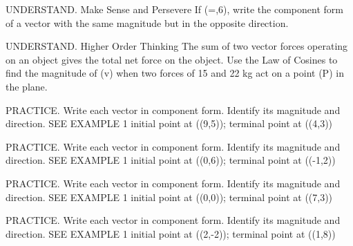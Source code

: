 \documentclass{article}
\newenvironment{practice}[2]{}{}        %
\newcommand{\answer}[1]{}               %
\newcommand{\placeholder}[2]{}          %
\newcommand{\te}[1]{}                   %
\begin{document}
\begin{practice}{15}{1}
UNDERSTAND. Make Sense and Persevere If (=,6\rangle), write the component form of a vector with the same magnitude but in the opposite direction.
\answer{(\langle2,-6\rangle)}
\end{practice}
\begin{practice}{16}{3}
UNDERSTAND. Higher Order Thinking The sum of two vector forces operating on an object gives the total net force on the object. Use the Law of Cosines to find the magnitude of (\vec v) when two forces of 15 and 22 kg act on a point (P) in the plane.
\placeholder{diagram}{Parallelogram of forces with lower-left vertex P. Blue arrows from P run up-left with magnitude 22 and right/slightly upward with magnitude 15. Dashed opposite sides are labeled 15 on top and 22 on right. Red resultant v runs from P to the opposite upper vertex. Interior angle at P is 100 degrees; interior lower-right angle is 80 degrees.}
\answer{The magnitude of (\vec v) is approximately 24 kg.}
\te{Printed force unit kg retained.}
\end{practice}
\begin{practice}{17}{1}
PRACTICE. Write each vector in component form. Identify its magnitude and direction. SEE EXAMPLE 1
initial point at ((9,5)); terminal point at ((4,3))
\answer{(\langle-5,-2\rangle); magnitude (=\sqrt{29}\approx5.4); direction (\approx201.8^\circ)}
\end{practice}
\begin{practice}{18}{1}
PRACTICE. Write each vector in component form. Identify its magnitude and direction. SEE EXAMPLE 1
initial point at ((0,6)); terminal point at ((-1,2))
\answer{(\langle-1,-4\rangle); magnitude (=\sqrt{17}\approx4.1); direction (\approx256^\circ)}
\end{practice}
\begin{practice}{19}{1}
PRACTICE. Write each vector in component form. Identify its magnitude and direction. SEE EXAMPLE 1
initial point at ((0,0)); terminal point at ((7,3))
\answer{(\langle7,3\rangle); magnitude (=\sqrt{58}\approx7.6); direction (\approx23.2^\circ)}
\end{practice}
\begin{practice}{20}{1}
PRACTICE. Write each vector in component form. Identify its magnitude and direction. SEE EXAMPLE 1
initial point at ((2,-2)); terminal point at ((1,8))
\answer{(\langle-1,10\rangle); magnitude (=\sqrt{101}\approx10.05); direction (\approx-84.3^\circ) or (95.7^\circ)}
\te{Printed -84.3 degrees describes the opposite direction; likely only 95.7 degrees is intended (or its coterminal angle -264.3 degrees).}
\end{practice}
\end{document}
